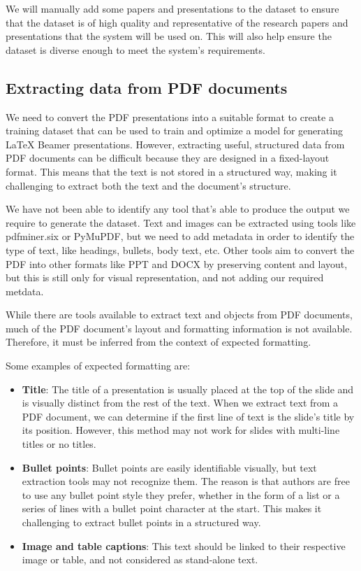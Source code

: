 We will manually add some papers and presentations to the dataset to ensure that the dataset is of high quality and representative of the research papers and presentations that the system will be used on. This will also help ensure the dataset is diverse enough to meet the system's requirements.

\subsection{Extracting data from PDF documents}
We need to convert the PDF presentations into a suitable format to create a training dataset that can be used to train and optimize a model for generating LaTeX Beamer presentations. However, extracting useful, structured data from PDF documents can be difficult because they are designed in a fixed-layout format. This means that the text is not stored in a structured way, making it challenging to extract both the text and the document's structure. 

We have not been able to identify any tool that's able to produce the output we require to generate the dataset.  Text and images can be extracted using tools like pdfminer.six or PyMuPDF, but we need to add metadata in order to identify the type of text, like headings, bullets, body text, etc. Other tools aim to convert the PDF into other formats like PPT and DOCX by preserving content and layout, but this is still only for visual representation, and not adding our required metdata.

While there are tools available to extract text and objects from PDF documents, much of the PDF document's layout and formatting information is not available. Therefore, it must be inferred from the context of expected formatting. 

Some examples of expected formatting are:

\begin{itemize}
    \item \textbf{Title}: The title of a presentation is usually placed at the top of the slide and is visually distinct from the rest of the text. When we extract text from a PDF document, we can determine if the first line of text is the slide's title by its position. However, this method may not work for slides with multi-line titles or no titles.
    \item \textbf{Bullet points}: Bullet points are easily identifiable visually, but text extraction tools may not recognize them. The reason is that authors are free to use any bullet point style they prefer, whether in the form of a list or a series of lines with a bullet point character at the start. This makes it challenging to extract bullet points in a structured way. 
    \item \textbf{Image and table captions}: This text should be linked to their respective image or table, and not considered as stand-alone text.
\end{itemize}

